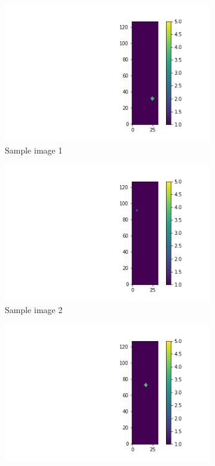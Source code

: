 \documentclass{article}
\begin{document}
\begin{figure}
  \centering
  \begin{subfigure}[b]{0.45\textwidth}
    \centering
    \includegraphics[totalheight=4cm]{circle_id/sample0.png}
    \caption{Sample image 1}
  \end{subfigure}
  \begin{subfigure}[b]{0.45\textwidth}
    \centering
    \includegraphics[totalheight=4cm]{circle_id/sample1.png}
    \caption{Sample image 2}
  \end{subfigure}
  \begin{subfigure}[b]{0.45\textwidth}
    \centering
    \includegraphics[totalheight=4cm]{circle_id/sample2.png}

\end{subfigure}
\end{figure}
\end{document}
